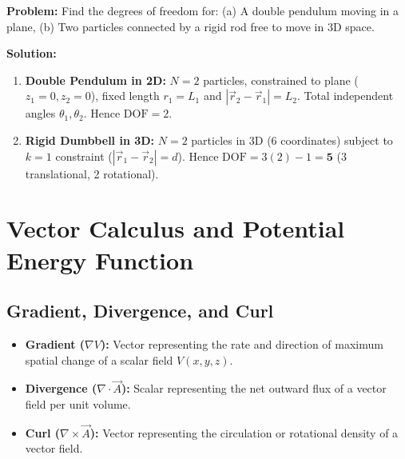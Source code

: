 \documentclass[12pt,a4paper]{article}
\begin{document}
\begin{tcolorbox}[examplebox, title={\textbf{Solved Problem 2: Degrees of Freedom of Connected Bodies}}]
\textbf{Problem:} Find the degrees of freedom for: (a) A double pendulum moving in a plane, (b) Two particles connected by a rigid rod free to move in 3D space.

\textbf{Solution:}\par\noindent
\begin{enumerate}[leftmargin=*, itemsep=2pt]
  \item \textbf{Double Pendulum in 2D:} $N=2$ particles, constrained to plane ($z_1=0, z_2=0$), fixed length $r_1=L_1$ and $|\vec{r}_2-\vec{r}_1|=L_2$. Total independent angles $\theta_1, \theta_2$. Hence \textbf{$\text{DOF} = 2$}.
  \item \textbf{Rigid Dumbbell in 3D:} $N=2$ particles in 3D ($6$ coordinates) subject to $k=1$ constraint ($|\vec{r}_1 - \vec{r}_2| = d$). Hence $\text{DOF} = 3(2) - 1 = \mathbf{5}$ (3 translational, 2 rotational).
\end{enumerate}
\end{tcolorbox}

\section{Vector Calculus and Potential Energy Function}

\subsection{Gradient, Divergence, and Curl}

\begin{tcolorbox}[defbox, title={\textbf{Definition: Gradient, Divergence, and Curl}}]
\begin{itemize}[leftmargin=*, itemsep=2pt]
  \item \textbf{Gradient ($\nabla V$):} Vector representing the rate and direction of maximum spatial change of a scalar field $V(x,y,z)$.
  \item \textbf{Divergence ($\nabla \cdot \vec{A}$):} Scalar representing the net outward flux of a vector field per unit volume.
  \item \textbf{Curl ($\nabla \times \vec{A}$):} Vector representing the circulation or rotational density of a vector field.
\end{itemize}
\end{tcolorbox}
\end{document}
